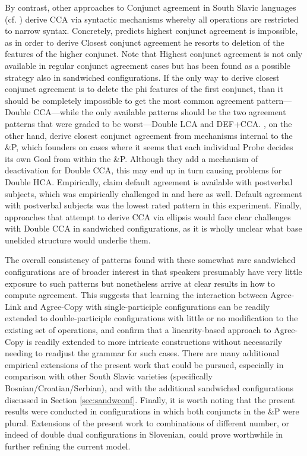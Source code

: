 \documentclass[output=paper
,modfonts
,nonflat]{langsci/langscibook}
\begin{document}
By contrast, other approaches to Conjunct agreement in South Slavic languages (cf. \citealt{boskovic:09,puskarmurphy:17}) derive CCA via syntactic mechanisms whereby all operations are restricted to narrow syntax. Concretely, \cite{boskovic:09} predicts highest conjunct agreement is impossible, as in order to derive Closest conjunct agreement he resorts to deletion of the features of the higher conjunct. Note that Highest conjunct agreement is not only available in regular conjunct agreement cases but has been found as a possible strategy also in sandwiched configurations. If the only way to derive closest conjunct agreement is to delete the phi features of the first conjunct, than it should be completely impossible to get the most common agreement pattern---Double CCA---while the only available patterns should be the two agreement patterns that were graded to be worst---Double LCA and DEF+CCA. \cite{puskarmurphy:17}, on the other hand, derive closest conjunct agreement from mechanisms internal to the \&P, which founders on cases where it seems that each individual Probe decides its own Goal from within the \&P. Although they add a mechanism of deactivation for Double CCA, this may end up in turn causing problems for Double HCA. Empirically, \cite{puskarmurphy:17} claim default agreement is available with postverbal subjects, which was empirically challenged in \cite{willergold:16} and here as well. Default agreement with postverbal subjects was the lowest rated pattern in this experiment. Finally, approaches that attempt to derive CCA via ellipsis would face clear challenges with Double CCA in sandwiched configurations, as it is wholly unclear what base unelided structure would underlie them.

The overall consistency of patterns found with these somewhat rare sandwiched configurations are of broader interest in that speakers presumably have very little exposure to such patterns but nonetheless arrive at clear results in how to compute agreement. This suggests that learning the interaction between Agree-Link and Agree-Copy with single-participle configurations can be readily extended to double-participle configurations with little or no modification to the existing set of operations, and confirm that a linearity-based approach to Agree-Copy is readily extended to more intricate constructions without necessarily needing to readjust the grammar for such cases. There are many additional empirical extensions of the present work that could be pursued, especially in comparison with other South Slavic varieties (specifically Bosnian/Croatian/Serbian), and with the additional sandwiched configurations discussed in Section \ref{sec:sandwconf}. Finally, it is worth noting that the present results were conducted in configurations in which both conjuncts in the \&P were plural. Extensions of the present work to combinations of different number, or indeed of double dual configurations in Slovenian, could prove worthwhile in further refining the current model.
\end{document}
